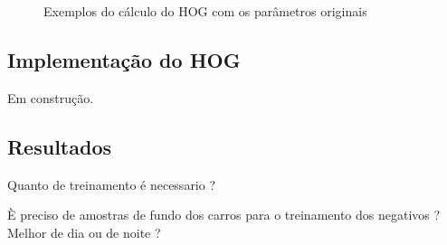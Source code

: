 \begin{figure}[ht!]
\centering
{}
  \caption{Exemplos do cálculo do HOG com os parâmetros originais}
  \label{fig:hog_example1}
\end{figure}

\subsection{Implementação do HOG}

Em construção.

\subsection{Resultados}

Quanto de treinamento é necessario ?

È preciso de amostras de fundo dos carros para o treinamento dos negativos ? Melhor de dia ou de noite ?

